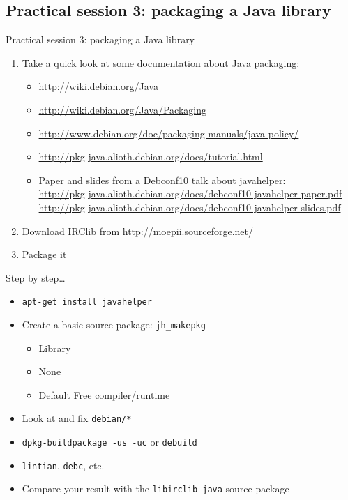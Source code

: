\documentclass[10pt,final]{beamer}
\begin{document}
\subsection{Practical session 3: packaging a Java library}
\begin{frame}{Practical session 3: packaging a Java library}
\begin{enumerate}
	\item Take a quick look at some documentation about Java packaging:\\
		\begin{itemize}
		\item \url{http://wiki.debian.org/Java}
      \hbr
		\item \url{http://wiki.debian.org/Java/Packaging}
      \hbr
		\item \url{http://www.debian.org/doc/packaging-manuals/java-policy/}
      \hbr
		\item \url{http://pkg-java.alioth.debian.org/docs/tutorial.html}
      \hbr
		\item Paper and slides from a Debconf10 talk about javahelper:\\
			{\footnotesize
			\url{http://pkg-java.alioth.debian.org/docs/debconf10-javahelper-paper.pdf}\\
			\url{http://pkg-java.alioth.debian.org/docs/debconf10-javahelper-slides.pdf}}
		\end{itemize}
		\br
	\item Download IRClib from \url{http://moepii.sourceforge.net/}
		\br
	\item Package it
\end{enumerate}
\end{frame}

\begin{frame}{Step by step\ldots}
\begin{itemize}
	\item \texttt{apt-get install javahelper}
		\hbr
	\item Create a basic source package: \texttt{jh\_makepkg}
		\begin{itemize}
			\item Library
			\item None
			\item Default Free compiler/runtime
		\end{itemize}
		\hbr
	\item Look at and fix \texttt{debian/*}
		\hbr
	\item \texttt{dpkg-buildpackage -us -uc} or \texttt{debuild}
		\hbr
	\item \texttt{lintian}, \texttt{debc}, etc.
		\hbr
	\item Compare your result with the \texttt{libirclib-java} source package
\end{itemize}
\end{frame}
\end{document}
